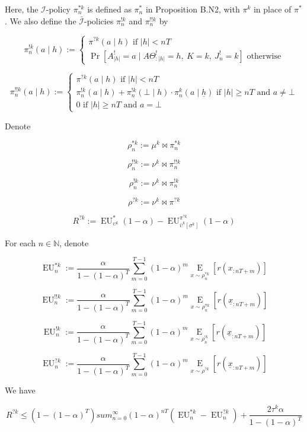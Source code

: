 \documentclass[a4paper]{article}
\newcommand{\AP}[1]{\left(#1\right)}
\newcommand{\AB}[1]{\left[#1\right]}
\newcommand{\E}[1]{\underset{#1}{\operatorname{E}}}
\newcommand{\Nats}{\mathbb{N}}
\newcommand{\Abs}[1]{\left\vert #1 \right\vert}
\newcommand{\In}{\mathcal{I}}
\newcommand{\Adi}{{\bar{\In}}}
\newcommand{\EU}{\operatorname{EU}}
\newcommand{\J}{J}
\begin{document}
Here, the $\In$-policy $\pi^{*k}_n$ is defined as $\pi^*_n$ in Proposition B.N2, with $\pi^k$ in place of $\pi^*$. We also define the $\Adi$-policies $\pi^{!k}_n$ and $\pi^{!!k}_n$ by

$$\pi^{!k}_n(a \mid h):=\begin{cases} \pi^{?k}(a \mid h) \text{ if } \Abs{h} < nT \\ \Pr\left[A^!_{\Abs{h}} = a \mid A\Theta^!_{:{\Abs{h}}} = h,\ K = k,\ \J^!_n = k\right] \text{ otherwise} \end{cases}$$

$$\pi^{!!k}_n(a \mid h):=\begin{cases} \pi^{?k}(a \mid h) \text{ if } \Abs{h} < nT \\ \pi^{!k}_n(a \mid h) + \pi^{!k}_n(\bot \mid h) \cdot \pi^k_n\left(a \mid \underline{h}\right) \text{ if } \Abs{h} \geq nT \text{ and } a \ne \bot \\ 0 \text{ if } \Abs{h} \geq nT \text{ and } a = \bot \end{cases}$$

Denote 

$$\rho^{*k}_n:=\mu^k\bowtie\pi^{*k}_n$$

$$\rho^{!!k}_n:=\nu^k\bowtie\pi^{!!k}_n$$ 

$$\rho^{!k}_n:=\nu^k\bowtie\pi^{!k}_n$$ 

$$\rho^{?k}:=\nu^k\bowtie\pi^{?k}$$ 

$$R^{?k}:=\EU^{*}_{\upsilon^k}(1-\alpha)-\EU^{\pi^{?k}}_{\bar{\upsilon}^k\AB{\sigma^k}}(1-\alpha)$$

For each $n \in \Nats$, denote

$$\EU_n^{*k}:=\frac{\alpha}{1-(1-\alpha)^T}\sum_{m=0}^{T-1} (1-\alpha)^{m}\E{x\sim\rho^{*k}_n}\left[r\left(x_{:nT+m}\right)\right]$$

$$\EU_n^{!!k}:=\frac{\alpha}{1-(1-\alpha)^T}\sum_{m=0}^{T-1} (1-\alpha)^{m}\E{x\sim\rho^{!!k}_n}\left[r\left(\underline{x}_{:nT+m}\right)\right]$$

$$\EU_n^{!k}:=\frac{\alpha}{1-(1-\alpha)^T}\sum_{m=0}^{T-1} (1-\alpha)^{m}\E{x\sim\rho^{!k}_n}\left[r\left(\underline{x}_{:nT+m}\right)\right]$$

$$\EU_n^{?k}:=\frac{\alpha}{1-(1-\alpha)^T}\sum_{m=0}^{T-1} (1-\alpha)^{m}\E{x\sim\rho^{?k}}\left[r\left(\underline{x}_{:nT+m}\right)\right]$$

We have

$$R^{?k} \leq \AP{1-(1-\alpha)^T}sum_{n=0}^\infty (1-\alpha)^{nT} \left(\EU^{*k}_n-\EU^{?k}_n\right) + \frac{2\tau^k\alpha}{1-(1-\alpha)^T}$$
\end{document}
